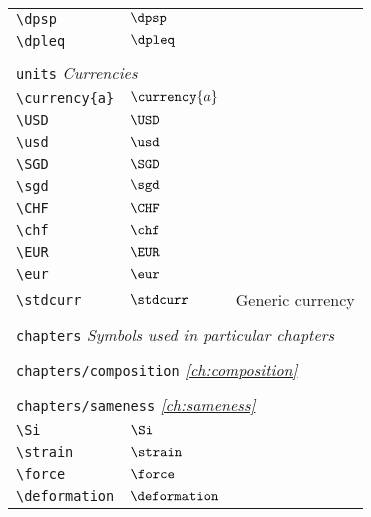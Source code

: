 \begin{longtable}{lll}
 {\color[rgb]{0.5,0.5,0.5}\texttt{\textbackslash dpsp}} & $\dpsp$ & \\ 
 {\color[rgb]{0.5,0.5,0.5}\texttt{\textbackslash dpleq}} & $\dpleq$ & \\ 
  &  & \\ 
 \multicolumn{3}{l}{{\color[rgb]{0.5,0.5,0.5}\texttt{units}} \emph{Currencies}}\\ 
 \hline
\hline
{\color[rgb]{0.5,0.5,0.5}\texttt{\textbackslash currency\{a\}}} & $\currency{a}$ & \\ 
 {\color[rgb]{0.5,0.5,0.5}\texttt{\textbackslash USD}} & $\USD$ & \\ 
 {\color[rgb]{0.5,0.5,0.5}\texttt{\textbackslash usd}} & $\usd$ & \\ 
 {\color[rgb]{0.5,0.5,0.5}\texttt{\textbackslash SGD}} & $\SGD$ & \\ 
 {\color[rgb]{0.5,0.5,0.5}\texttt{\textbackslash sgd}} & $\sgd$ & \\ 
 {\color[rgb]{0.5,0.5,0.5}\texttt{\textbackslash CHF}} & $\CHF$ & \\ 
 {\color[rgb]{0.5,0.5,0.5}\texttt{\textbackslash chf}} & $\chf$ & \\ 
 {\color[rgb]{0.5,0.5,0.5}\texttt{\textbackslash EUR}} & $\EUR$ & \\ 
 {\color[rgb]{0.5,0.5,0.5}\texttt{\textbackslash eur}} & $\eur$ & \\ 
 {\color[rgb]{0.5,0.5,0.5}\texttt{\textbackslash stdcurr}} & $\stdcurr$ &  Generic currency\\ 
  &  & \\ 
 \multicolumn{3}{l}{{\color[rgb]{0.5,0.5,0.5}\texttt{chapters}} \emph{Symbols used in particular chapters}}\\ 
 \hline
\hline
 &  & \\ 
 \multicolumn{3}{l}{{\color[rgb]{0.5,0.5,0.5}\texttt{chapters/composition}} \emph{\cref{ch:composition}}}\\ 
 \hline
 &  & \\ 
 \multicolumn{3}{l}{{\color[rgb]{0.5,0.5,0.5}\texttt{chapters/sameness}} \emph{\cref{ch:sameness}}}\\ 
 \hline
{\color[rgb]{0.5,0.5,0.5}\texttt{\textbackslash Si}} & $\Si$ & \\ 
 {\color[rgb]{0.5,0.5,0.5}\texttt{\textbackslash strain}} & $\strain$ & \\ 
 {\color[rgb]{0.5,0.5,0.5}\texttt{\textbackslash force}} & $\force$ & \\ 
 {\color[rgb]{0.5,0.5,0.5}\texttt{\textbackslash deformation}} & $\deformation$ & \\ 

\end{longtable}
